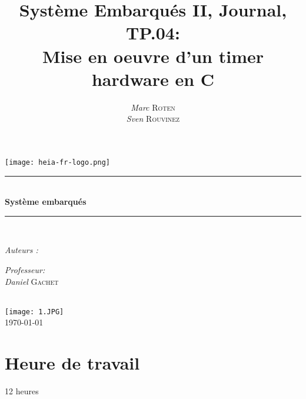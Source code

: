 

\title{Système Embarqués II, Journal, TP.04:\\ Mise en oeuvre d'un timer hardware en C}
\author{\textsl{Marc} \textsc{Roten} \\ \textsl{Sven} \textsc{Rouvinez}}
\date{}


    \begin{titlepage}
        \begin{center}
            \texttt{[image: heia-fr-logo.png]}\\[1.3cm]
            
            \rule{\linewidth}{0.3mm} \\[0.3cm]
            {\huge \bfseries Système embarqués \\[0.5cm]} 
            \rule{\linewidth}{0.3mm} \\[0.8cm]
            \noindent
            \begin{minipage}[t]{0.4\textwidth}
                \begin{flushleft} \large
                    \emph{Auteurs :}\\
                    \theauthor
                \end{flushleft}
            \end{minipage}
            \begin{minipage}[t]{0.4\textwidth} 
                \begin{flushright} \large
                    \emph{Professeur:}\\
                    \textsl{Daniel} \textsc{Gachet}\\ 
                \end{flushright} 
                \vfill
            \end{minipage}\\[1.3cm]
            \texttt{[image: 1.JPG]}\\[1.5cm]
            \vspace*{1\baselineskip}
            \today \\[0.7cm]
        \end{center}
    \end{titlepage}
    \tableofcontents
    \clearpage
\section{Heure de travail}
12 heures


